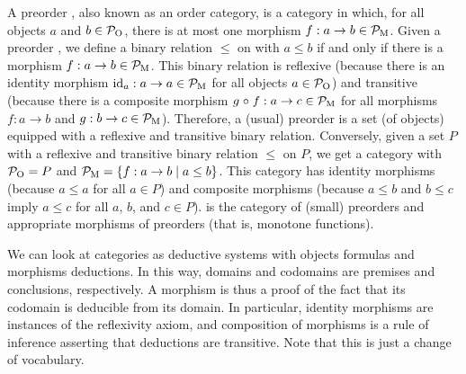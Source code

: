\begin{example}
  \label{ex:preorder}


  A preorder , also known as an order category, is a category
  in which, for all objects $a$ and $b \in \mathcal{P}_{\operatorname{O}}$, there is at most
  one morphism $f: a \to b \in \mathcal{P}_{\operatorname{M}}$. Given a preorder , we
  define a binary relation $\leq$ on  with $a \leq b$ if and
  only if there is a morphism $f: a \to b \in \mathcal{P}_{\operatorname{M}}$. This binary
  relation is reflexive (because there is an identity morphism
  $\operatorname{id}_{a}: a \to a \in \mathcal{P}_{\operatorname{M}}$ for all objects $a \in \mathcal{P}_{\operatorname{O}}$)
  and transitive (because there is a composite morphism $g \mathrel{\circ} f: a
  \to c \in \mathcal{P}_{\operatorname{M}}$ for all morphisms $f: a \to b$ and $g: b \to c
  \in \mathcal{P}_{\operatorname{M}}$). Therefore, a (usual) preorder is a set (of objects)
  equipped with a reflexive and transitive binary relation.
  Conversely, given a set $P$ with a reflexive and transitive binary
  relation $\leq$ on $P$, we get a category  with $\mathcal{P}_{\operatorname{O}} =
  P$ and $\mathcal{P}_{\operatorname{M}} = \{f: a \to b \mid a \leq b\}$. This category has
  identity morphisms (because $a \leq a$ for all $a \in P$) and
  composite morphisms (because $a \leq b$ and $b \leq c$ imply $a \leq
  c$ for all $a$, $b$, and $c \in P$).  is the category of
  (small) preorders and appropriate morphisms of preorders (that is,
  monotone functions).

\end{example}

\begin{example}
  \label{ex:deductive-system}



  We can look at categories as deductive systems with objects formulas
  and morphisms deductions. In this way, domains and co\-do\-mains are
  premises and conclusions, respectively. A morphism is thus a proof
  of the fact that its codomain is deducible from its domain. In
  particular, identity morphisms are instances of the reflexivity
  axiom, and composition of morphisms is a rule of inference asserting
  that deductions are transitive. Note that this is just a change of
  vocabulary.


\end{example}

